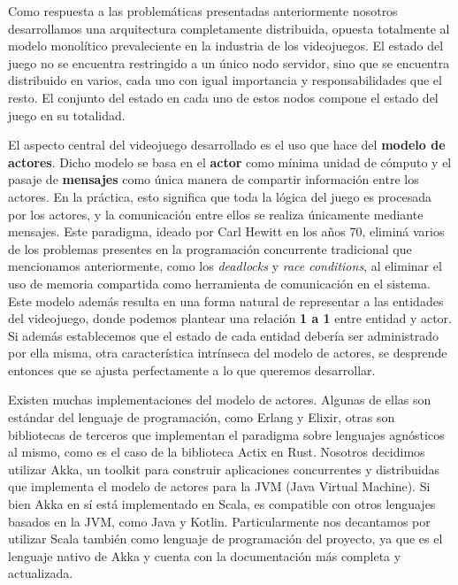 
\noindent Como respuesta a las problemáticas presentadas anteriormente nosotros desarrollamos una arquitectura
completamente distribuida, opuesta totalmente al modelo monolítico prevaleciente en la industria de los videojuegos. 
El estado del juego no se encuentra restringido a un único nodo servidor, sino que se encuentra 
distribuido en varios, cada uno con igual importancia y responsabilidades que el resto. El conjunto del estado en cada uno de estos nodos compone el 
estado del juego en su totalidad.

El aspecto central del videojuego desarrollado es el uso que hace del \textbf{modelo de actores}.
Dicho modelo se basa en el \textbf{actor} como mínima unidad de cómputo y el pasaje de \textbf{mensajes} como única manera
de compartir información entre los actores. En la práctica, esto significa que toda la lógica del juego
es procesada por los actores, y la comunicación entre ellos se realiza únicamente mediante mensajes.
Este paradigma, ideado por Carl Hewitt en los años 70, eliminá varios de los problemas presentes
en la programación concurrente tradicional que mencionamos anteriormente, como
los \textit{deadlocks} y \textit{race conditions}, al eliminar el uso de memoria compartida
como herramienta de comunicación en el sistema.
Este modelo además resulta en una forma natural de representar a las entidades del videojuego, donde podemos plantear una 
relación \textbf{1 a 1} entre entidad y actor. Si además establecemos que el estado de cada entidad 
debería ser administrado por ella misma, otra característica intrínseca del modelo de actores,
se desprende entonces que se ajusta perfectamente a lo que queremos desarrollar.

Existen muchas implementaciones del modelo de actores. Algunas de ellas son estándar del lenguaje de programación,
como Erlang y Elixir, otras son bibliotecas de terceros que implementan el paradigma sobre lenguajes
agnósticos al mismo, como es el caso de la biblioteca Actix en Rust.
Nosotros decidimos utilizar Akka, un toolkit para construir aplicaciones concurrentes
y distribuidas que implementa el modelo de actores para la JVM (Java Virtual Machine).
Si bien Akka en sí está implementado en Scala, es compatible con otros lenguajes
basados en la JVM, como Java y Kotlin. Particularmente nos decantamos por utilizar Scala también
como lenguaje de programación del proyecto, ya que es el lenguaje nativo de Akka y cuenta con la documentación
más completa y actualizada.

